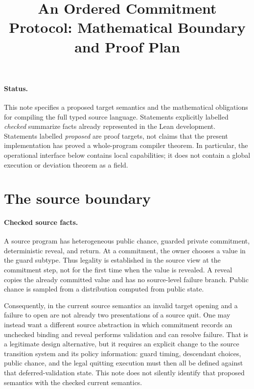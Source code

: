 \documentclass[11pt]{article}
\title{An Ordered Commitment Protocol: Mathematical Boundary and Proof Plan}
\author{}
\date{}
\begin{document}
\maketitle

\paragraph{Status.}
This note specifies a proposed target semantics and the mathematical obligations
for compiling the full typed source language.  Statements explicitly labelled
\emph{checked} summarize facts already represented in the Lean development.
Statements labelled \emph{proposed} are proof targets, not claims that the
present implementation has proved a whole-program compiler theorem.  In
particular, the operational interface below contains local capabilities; it
does not contain a global execution or deviation theorem as a field.

\section{The source boundary}

\paragraph{Checked source facts.}
A source program has heterogeneous public chance, guarded private commitment,
deterministic reveal, and return.  At a commitment, the owner chooses a value
in the guard subtype.  Thus legality is established in the source view at the
commitment step, not for the first time when the value is revealed.  A reveal
copies the already committed value and has no source-level failure branch.
Public chance is sampled from a distribution computed from public state.

Consequently, in the current source semantics an invalid target opening and a
failure to open are not already two presentations of a source quit.  One may
instead want a different source abstraction in which commitment records an
unchecked binding and reveal performs validation and can resolve failure.  That
is a legitimate design alternative, but it requires an explicit change to the
source transition system and its policy information: guard timing, descendant
choices, public chance, and the legal quitting execution must then all be
defined against that deferred-validation state.  This note does not silently
identify that proposed semantics with the checked current semantics.
\end{document}
